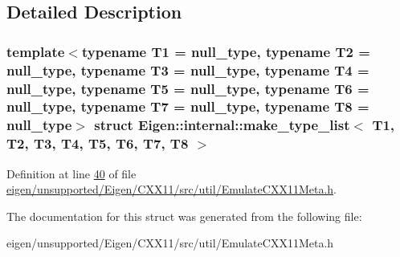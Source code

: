 \subsection{Detailed Description}
\subsubsection*{template$<$typename T1 = null\+\_\+type, typename T2 = null\+\_\+type, typename T3 = null\+\_\+type, typename T4 = null\+\_\+type, typename T5 = null\+\_\+type, typename T6 = null\+\_\+type, typename T7 = null\+\_\+type, typename T8 = null\+\_\+type$>$\newline
struct Eigen\+::internal\+::make\+\_\+type\+\_\+list$<$ T1, T2, T3, T4, T5, T6, T7, T8 $>$}



Definition at line \hyperlink{eigen_2unsupported_2_eigen_2_c_x_x11_2src_2util_2_emulate_c_x_x11_meta_8h_source_l00040}{40} of file \hyperlink{eigen_2unsupported_2_eigen_2_c_x_x11_2src_2util_2_emulate_c_x_x11_meta_8h_source}{eigen/unsupported/\+Eigen/\+C\+X\+X11/src/util/\+Emulate\+C\+X\+X11\+Meta.\+h}.



The documentation for this struct was generated from the following file\+:\begin{DoxyCompactItemize}
\item 
eigen/unsupported/\+Eigen/\+C\+X\+X11/src/util/\+Emulate\+C\+X\+X11\+Meta.\+h\end{DoxyCompactItemize}
